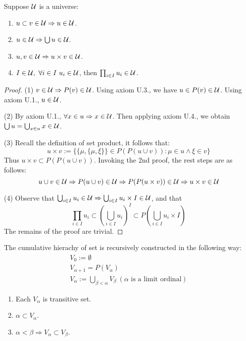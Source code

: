 \begin{corollary}
  Suppose ${\cal U}$ is a universe:
  \begin{enumerate}
    \item $u \subset v \in {\cal U} \Rightarrow u \in {\cal U}$.
    \item $u \in {\cal U} \Rightarrow \bigcup u \in {\cal U}$.
    \item $u , v \in {\cal U} \Rightarrow u \times v \in {\cal U}$.
    \item $I \in {\cal U}, \ \forall i \in I\ u_i \in {\cal U}$, then $\prod_{i \in I}u_i \in {\cal U}$.
  \end{enumerate}
\end{corollary}
\begin{proof}
  (1)  $v \in {\cal U} \Rightarrow P(v) \in {\cal U}$. Using axiom U.3., we have $u \in P(v) \in {\cal U}$. Using axiom U.1., $u \in {\cal U}$. 

  (2) By axiom U.1., $\forall x \in u \Rightarrow x \in {\cal U}$. Then applying axiom U.4., we obtain $\bigcup u = \bigcup_{x \in u} x \in {\cal U}$.

  (3) Recall the definition of set product, it follows that:
  \[
    u \times v := \{ \{ \mu, \{ \mu, \xi \} \} \in P(P(u \cup v)): \mu \in u \land \xi \in v \}
  \]
  Thus $u \times v \subset P(P(u \cup v))$. Invoking the 2nd proof, the rest steps are as follows:
  \[
    u \cup v \in {\cal U} \Rightarrow P(u \cup v) \in {\cal U} \Rightarrow P(P(u \times v)) \in {\cal U} \Rightarrow u\times v \in {\cal U}
  \]

  (4) Observe that $\bigcup_{i \in I}u_i \in {\cal U} \Rightarrow \bigcup_{i \in I}u_i \times I \in {\cal U}$, and that
  \[
    \prod_{i\in I} u_i \subset (\bigcup_{i \in I}u_i)^I \subset P(\bigcup_{i \in I}u_i \times I)
  \]
  The remains of the proof are trivial.
\end{proof}




\begin{definition}
  The cumulative hierachy of set is recursively constructed in the following way:
  \begin{gather*}
    V_0 := \emptyset \\
    V_{\alpha + 1} = P(V_{\alpha}) \\
    V_{\alpha} := \bigcup_{\beta < \alpha} V_{\beta} \ (\alpha \text{ is a limit ordinal})
  \end{gather*}
\end{definition}

\begin{corollary}
  \hfill

  \begin{enumerate}
    \item Each $V_{\alpha}$ is transitive set.
    \item $\alpha \subset V_{\alpha}$.
    \item $\alpha < \beta \Rightarrow V_{\alpha} \subset V_{\beta}$.
  \end{enumerate}
\end{corollary}

